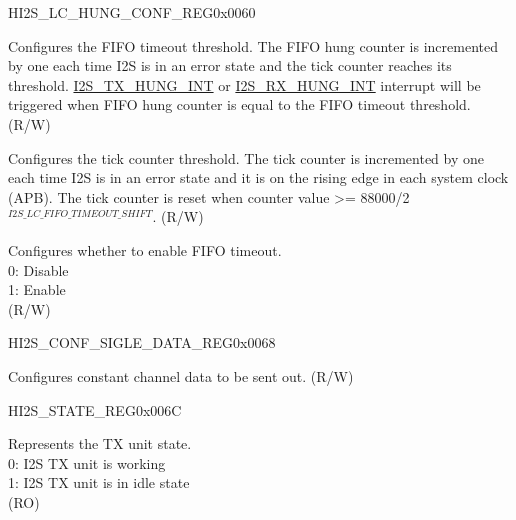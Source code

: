 \begin{register}{H}{I2S\_LC\_HUNG\_CONF\_REG}{0x0060}\label{regdesc:I2SLCHUNGCONFREG}
%
%
%
%
\regnewline%
\begin{regdesc}\begin{reglist}
\label{fielddesc:I2SLCFIFOTIMEOUT}\item [I2S\_LC\_FIFO\_TIMEOUT] Configures the FIFO timeout threshold. The FIFO hung counter is incremented by one each time I2S is in an error state and the tick counter reaches its threshold. \hyperref[int:I2STXHUNGINT]{I2S\_TX\_HUNG\_INT} or \hyperref[int:I2SRXHUNGINT]{I2S\_RX\_HUNG\_INT} interrupt will be triggered when FIFO hung counter is equal to the FIFO timeout threshold. (R/W)
\label{fielddesc:I2SLCFIFOTIMEOUTSHIFT}\item [I2S\_LC\_FIFO\_TIMEOUT\_SHIFT] Configures the tick counter threshold. The tick counter is incremented by one each time I2S is in an error state and it is on the rising edge in each system clock (APB). The tick counter is reset when counter value >= 88000/2$^{I2S\_LC\_FIFO\_TIMEOUT\_SHIFT}$. (R/W)
\label{fielddesc:I2SLCFIFOTIMEOUTENA}\item [I2S\_LC\_FIFO\_TIMEOUT\_ENA] Configures whether to enable FIFO timeout. \\
0: Disable\\
1: Enable\\
(R/W)
\end{reglist}\end{regdesc}
\end{register}


\begin{register}{H}{I2S\_CONF\_SIGLE\_DATA\_REG}{0x0068}\label{regdesc:I2SCONFSIGLEDATAREG}
%
\regnewline%
\begin{regdesc}\begin{reglist}
\label{fielddesc:I2SSINGLEDATA}\item [I2S\_SINGLE\_DATA] Configures constant channel data to be sent out. (R/W)
\end{reglist}\end{regdesc}
\end{register}


\begin{register}{H}{I2S\_STATE\_REG}{0x006C}\label{regdesc:I2SSTATEREG}
%
%
\regnewline%
\begin{regdesc}\begin{reglist}
\label{fielddesc:I2STXIDLE}\item [I2S\_TX\_IDLE] Represents the TX unit state. \\
0: I2S TX unit is working\\
1: I2S TX unit is in idle state\\
(RO)
\end{reglist}\end{regdesc}
\end{register}


